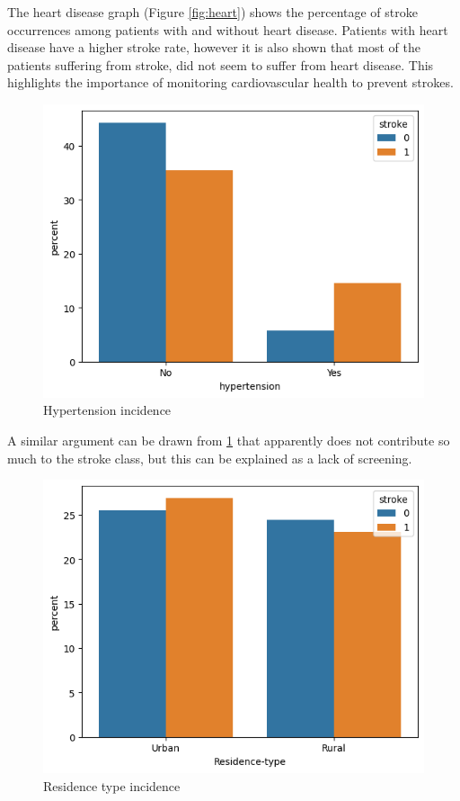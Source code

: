 \documentclass{Configuration_Files/Template}
\begin{document}
The heart disease graph (Figure \ref{fig:heart}) shows the percentage of stroke occurrences among patients with and without heart disease. Patients with heart disease have a higher stroke rate, however it is also shown that most of the patients suffering from stroke, did not seem to suffer from heart disease. This highlights the importance of monitoring cardiovascular health to prevent strokes.

\begin{figure}[h]
\centering
\includegraphics[scale=0.4]{Images/hypertension_graph.png}
\caption{Hypertension incidence}
\label{fig:hypertension}
\end{figure}

A similar argument can be drawn from \ref{fig:hypertension} that apparently does not contribute so much to the stroke class, but this can be explained as a lack of screening.

\begin{figure}[h]
\centering
\includegraphics[scale=0.4]{Images/residence_type_graph.png}
\caption{Residence type incidence}
\label{fig:residence}
\end{figure}
\end{document}
